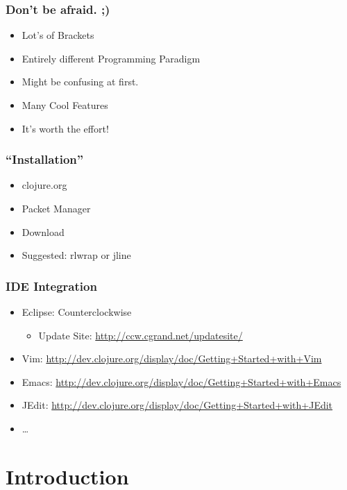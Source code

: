 \documentclass{beamer}
\begin{document}
  \begin{frame}
      \frametitle{Don't be afraid. ;)}

      \begin{itemize}
          \item Lot's of Brackets
          \item Entirely different Programming Paradigm
          \item Might be confusing at first.
          \item Many Cool Features
          \item It's worth the effort!
      \end{itemize}
  \end{frame}
  
  \begin{frame}
    \frametitle{``Installation''}
    \begin{itemize}
      \item clojure.org
      \item Packet Manager
      \item Download
      \item Suggested: rlwrap or jline
    \end{itemize}
  \end{frame}

  \begin{frame}
    \frametitle{IDE Integration}
    \begin{itemize}
      \item Eclipse: Counterclockwise
          \begin{itemize}
              \item Update Site: \url{http://ccw.cgrand.net/updatesite/}
          \end{itemize}
      \item Vim: \url{http://dev.clojure.org/display/doc/Getting+Started+with+Vim}
      \item Emacs: \url{http://dev.clojure.org/display/doc/Getting+Started+with+Emacs}
      \item JEdit: \url{http://dev.clojure.org/display/doc/Getting+Started+with+JEdit}
      \item \ldots
    \end{itemize}
  \end{frame}
  

  \section{Introduction}
\end{document}
